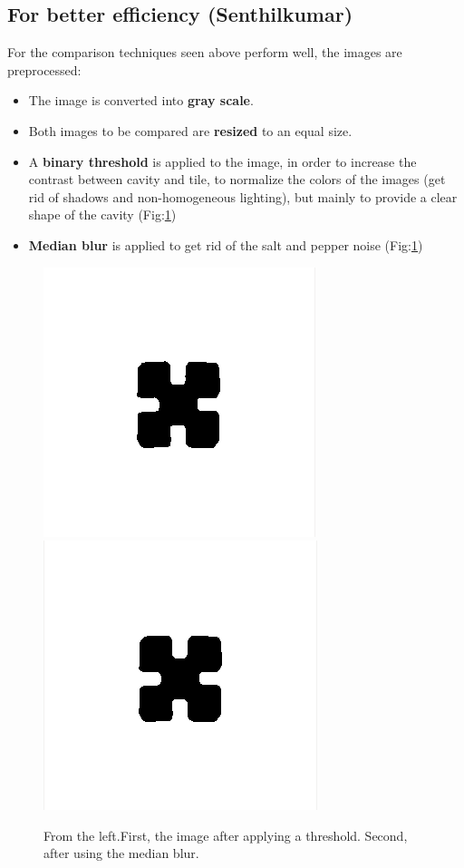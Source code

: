 \documentclass{article}
\begin{document}
\subsection*{For better efficiency (Senthilkumar)}
For the comparison techniques seen above perform well, the images are preprocessed:
\begin{itemize}
\item The image is converted into \textbf{gray scale}. 
\item Both images to be compared are \textbf{resized} to an equal size.
\item A \textbf{binary threshold} is applied to the image, in order to increase the contrast between cavity and tile, to normalize the colors of the images (get rid of shadows and non-homogeneous lighting), but mainly to provide a clear shape of the cavity (Fig:\ref{fig:Comparions_PreProcessing})
\item \textbf{Median blur} is applied to get rid of the salt and pepper noise (Fig:\ref{fig:Comparions_PreProcessing})
\end{itemize}
\begin{figure}[h!]
\begin{minipage}{\textwidth}
\centering 
\includegraphics[scale = 0.3]{images/AfterThreshholding.png}
\hspace{1cm}
\includegraphics[scale = 0.3 ]{images/AfterMedianBlur.png}
\caption{From the left.First, the image after applying a threshold. Second, after using the median blur.}
\label{fig:Comparions_PreProcessing}
\end{minipage}
\end{figure}
\end{document}
